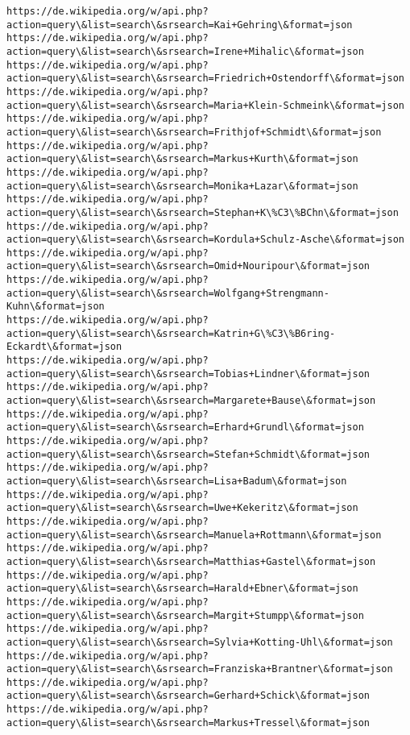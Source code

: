 \documentclass[11pt]{article}
\begin{document}
\begin{Verbatim}[commandchars=\\\{\}]
https://de.wikipedia.org/w/api.php?action=query\&list=search\&srsearch=Kai+Gehring\&format=json
https://de.wikipedia.org/w/api.php?action=query\&list=search\&srsearch=Irene+Mihalic\&format=json
https://de.wikipedia.org/w/api.php?action=query\&list=search\&srsearch=Friedrich+Ostendorff\&format=json
https://de.wikipedia.org/w/api.php?action=query\&list=search\&srsearch=Maria+Klein-Schmeink\&format=json
https://de.wikipedia.org/w/api.php?action=query\&list=search\&srsearch=Frithjof+Schmidt\&format=json
https://de.wikipedia.org/w/api.php?action=query\&list=search\&srsearch=Markus+Kurth\&format=json
https://de.wikipedia.org/w/api.php?action=query\&list=search\&srsearch=Monika+Lazar\&format=json
https://de.wikipedia.org/w/api.php?action=query\&list=search\&srsearch=Stephan+K\%C3\%BChn\&format=json
https://de.wikipedia.org/w/api.php?action=query\&list=search\&srsearch=Kordula+Schulz-Asche\&format=json
https://de.wikipedia.org/w/api.php?action=query\&list=search\&srsearch=Omid+Nouripour\&format=json
https://de.wikipedia.org/w/api.php?action=query\&list=search\&srsearch=Wolfgang+Strengmann-Kuhn\&format=json
https://de.wikipedia.org/w/api.php?action=query\&list=search\&srsearch=Katrin+G\%C3\%B6ring-Eckardt\&format=json
https://de.wikipedia.org/w/api.php?action=query\&list=search\&srsearch=Tobias+Lindner\&format=json
https://de.wikipedia.org/w/api.php?action=query\&list=search\&srsearch=Margarete+Bause\&format=json
https://de.wikipedia.org/w/api.php?action=query\&list=search\&srsearch=Erhard+Grundl\&format=json
https://de.wikipedia.org/w/api.php?action=query\&list=search\&srsearch=Stefan+Schmidt\&format=json
https://de.wikipedia.org/w/api.php?action=query\&list=search\&srsearch=Lisa+Badum\&format=json
https://de.wikipedia.org/w/api.php?action=query\&list=search\&srsearch=Uwe+Kekeritz\&format=json
https://de.wikipedia.org/w/api.php?action=query\&list=search\&srsearch=Manuela+Rottmann\&format=json
https://de.wikipedia.org/w/api.php?action=query\&list=search\&srsearch=Matthias+Gastel\&format=json
https://de.wikipedia.org/w/api.php?action=query\&list=search\&srsearch=Harald+Ebner\&format=json
https://de.wikipedia.org/w/api.php?action=query\&list=search\&srsearch=Margit+Stumpp\&format=json
https://de.wikipedia.org/w/api.php?action=query\&list=search\&srsearch=Sylvia+Kotting-Uhl\&format=json
https://de.wikipedia.org/w/api.php?action=query\&list=search\&srsearch=Franziska+Brantner\&format=json
https://de.wikipedia.org/w/api.php?action=query\&list=search\&srsearch=Gerhard+Schick\&format=json
https://de.wikipedia.org/w/api.php?action=query\&list=search\&srsearch=Markus+Tressel\&format=json

\end{Verbatim}
\end{document}
